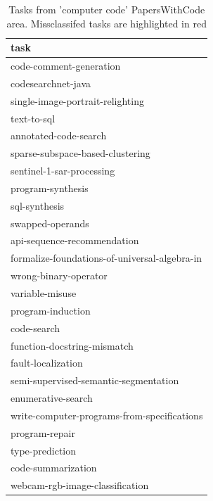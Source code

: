 \documentclass[11pt]{report}
\begin{document}
  \begin{table}[htbp]
\centering
\caption{Tasks from 'computer code' PapersWithCode area. Missclassifed tasks are
highlighted in red}
\begin{tabular}{|l|}
\hline
\toprule
                                          task \\
\hline

\midrule
                       code-comment-generation \\
                            codesearchnet-java \\
              {\color{red} single-image-portrait-relighting}\\
                                   text-to-sql \\
                         annotated-code-search \\
              {\color{red} sparse-subspace-based-clustering}\\
                     sentinel-1-sar-processing \\
                             program-synthesis \\
                                 sql-synthesis \\
                              swapped-operands \\
                   api-sequence-recommendation \\
 formalize-foundations-of-universal-algebra-in \\
                         wrong-binary-operator \\
                               variable-misuse \\
                             program-induction \\
                                   code-search \\
                   function-docstring-mismatch \\
                            fault-localization \\
         semi-supervised-semantic-segmentation \\
                            {\color{red} enumerative-search}\\
   write-computer-programs-from-specifications \\
                                program-repair \\
                               type-prediction \\
                            code-summarization \\
               {\color{red} webcam-rgb-image-classification}\\

\end{tabular}
\end{table}
\end{document}
